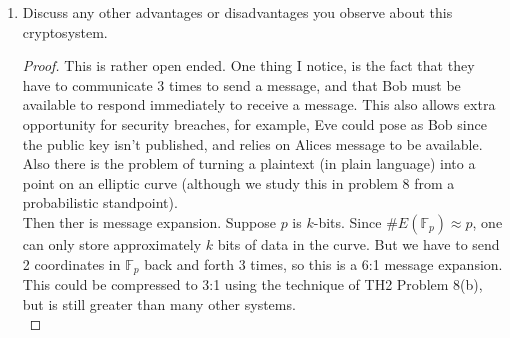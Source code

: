 \documentclass[11pt]{article}
\newcommand{\bF}{\mathbb{F}}
\newcommand{\cO}{\mathcal{O}}
\begin{document}
\begin{enumerate}
{\begin{enumerate}
\begin{proof}
      \[b'Q = abb'M = a(1+ln)M = a(M + lnM) = a(M+\cO) = aM = P.\]
      Therefore she can consult an ECDHP oracle, feeding them, $Q, a'Q$, and $b'Q$ (which we have seen are all public), and obtain $a'b'Q$.  But this is $a'b'abQ = S=M$.
    \end{proof}
    \item{
    Discuss any other advantages or disadvantages you observe about this cryptosystem.
    }
    \begin{proof}
      This is rather open ended.  One thing I notice, is the fact that they have to communicate 3 times to send a message, and that Bob must be available to respond immediately to receive a message.  This also allows extra opportunity for security breaches, for example, Eve could pose as Bob since the public key isn't published, and relies on Alices message to be available.\\

      Also there is the problem of turning a plaintext (in plain language) into a point on an elliptic curve (although we study this in problem 8 from a probabilistic standpoint).\\

      Then ther is message expansion.  Suppose $p$ is $k$-bits.  Since $\#E(\bF_p)\approx p$, one can only store approximately $k$ bits of data in the curve.  But we have to send 2 coordinates in $\bF_p$ back and forth 3 times, so this is a 6:1 message expansion.  This could be compressed to 3:1 using the technique of TH2 Problem 8(b), but is still greater than many other systems.\\


\end{proof}
\end{enumerate}}
\end{enumerate}
\end{document}
